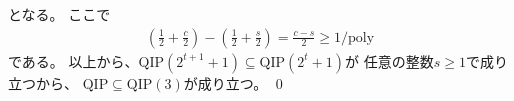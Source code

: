 \documentclass[a4paper, 10pt]{jsarticle}
\begin{document}
となる。
ここで
\begin{align}
	\left( \frac{1}{2} + \frac{c}{2} \right)
	- \left( \frac{1}{2} + \frac{s}{2} \right)
	= \frac{c - s}{2} \geq 1/\mathrm{poly}
\end{align}
である。
以上から、$\mathrm{QIP}(2^{t+1} + 1) \subseteq \mathrm{QIP}(2^t + 1)$が
任意の整数$s \geq 1$で成り立つから、
$\mathrm{QIP} \subseteq \mathrm{QIP}(3)$が成り立つ。
\qed
\end{document}

